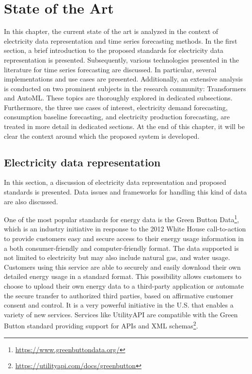 \chapter{State of the Art}
\label{cha:soa}
\vspace{0.4 cm}

In this chapter, the current state of the art is analyzed in the context of electricity data representation and time series forecasting methods.
In the first section, a brief introduction to the proposed standards for electricity data representation is presented.
Subsequently, various technologies presented in the literature for time series forecasting are discussed.
In particular, several implementations and use cases are presented.
Additionally, an extensive analysis is conducted on two prominent subjects in the research community: Transformers and AutoML.
These topics are thoroughly explored in dedicated subsections.
Furthermore, the three use cases of interest, electricity demand forecasting, consumption baseline forecasting, and electricity production forecasting, are treated in more detail in dedicated sections.
At the end of this chapter, it will be clear the context around which the proposed system is developed.


\section{Electricity data representation}
\label{sec:data}
\vspace{0.2 cm}

In this section, a discussion of electricity data representation and proposed standards is presented.
Data issues and frameworks for handling this kind of data are also discussed.

One of the most popular standards for energy data is the Green Button Data\footnote{ \url{https://www.greenbuttondata.org/} }, which is an industry initiative in response to the 2012 White House call-to-action to provide customers easy and secure access to their energy usage information in a both consumer-friendly and computer-friendly format.
The data supported is not limited to electricity but may also include natural gas, and water usage.
Customers using this service are able to securely and easily download their own detailed energy usage in a standard format.
This possibility allows customers to choose to upload their own energy data to a third-party application or automate the secure transfer to authorized third parties, based on affirmative customer consent and control.
It is a very powerful initiative in the U.S. that enables a variety of new services.
Services like UtilityAPI are compatible with the Green Button standard providing support for APIs and XML schemas\footnote{ \url{https://utilityapi.com/docs/greenbutton} }.

